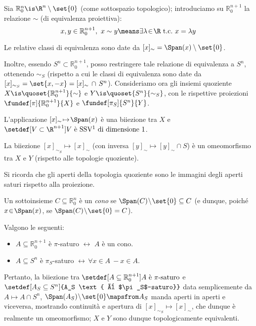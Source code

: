 

\newcommand*\Ps{\mathbb{P}} %
\newcommand*\Ro[1][n]{\mathbb{R}_0^{#1}} %
\newcommand*\tc{\ \text{t.c.} \ } %

Sia $\Ro \is \R^n \setminus \set{0}$ (come sottospazio topologico); introduciamo su $\Ro[n+1]$ la relazione $\sim $ (di equivalenza proiettiva): \[
x, y \in \Ro[n+1], \ x \sim y \means  \exists \lambda \! \in \! \R \tc x = \lambda y \]

Le relative classi di equivalenza sono date da $[x]_\sim = \Span(x) \setminus \set{0}$.

Inoltre, essendo $S^n \subset \Ro[n+1]$, posso restringere tale relazione di equivalenza a $S^n$, ottenendo $\sim_S$ (rispetto a cui le classi di equivalenza sono date da $[x]_{\sim_S} = \set{x, -x} = [x]_\sim \, \cap \, S^n$).
Consideriamo ora gli insiemi quoziente $X \is \quoset{\Ro[n+1]}{\sim}$ e $Y \is \quoset{S^n}{\sim_S}$, con le rispettive proiezioni $\fundef[\pi]{\Ro[n+1]}{X}$ e $\fundef[\pi_S]{S^n}{Y}$.

\begin{oss}
	L'applicazione $[x]_\sim \! \mapsto \! \Span(x)$ è una biiezione tra $X$ e \break
	$\setdef[V \subset \R^{n+1}]{V \text{ è SSV\footnotemark{} di dimensione 1}}$.
\end{oss}

\begin{prop}
	La biiezione $[x]_{\sim_S} \! \mapsto \! [x]_\sim$ (con inversa $[y]_\sim \! \mapsto \! [y]_\sim \cap S$) è un omeomorfismo tra $X$ e $Y$ (rispetto alle topologie quoziente).
\end{prop}

Si ricorda che gli aperti della topologia quoziente sono le immagini degli aperti saturi rispetto alla proiezione.

\begin{defn}[Cono]
	Un sottoinsieme $C\subseteq\Ro$ è un \emph{cono} se $\Span(C)\!\setminus\!\set{0}\subseteq C$ (e dunque, poiché $x\!\in\!\Span(x)$, se $\Span(C)\!\setminus\!\set{0}=C$).
\end{defn}
\begin{lemma}
	 Valgono le seguenti:
	\begin{itemize}
		\item $A \subseteq \Ro[n+1]$ è $\pi$-saturo $\leftrightarrow$ $A$ è un cono.
		\item $A \subseteq S^n$ è $\pi_S$-saturo $\leftrightarrow \, \forall x \!\in\! A \ -\!x \!\in\! A$.
	\end{itemize}
\end{lemma}

Pertanto, la biiezione tra $\setdef[A \subseteq {\Ro[n+1]} ]{A \text{ è $\pi$-saturo}}$ e $\setdef[A_S\subseteq S^n]{A_S \text{ è $\pi_S$-saturo}}$ data semplicemente da $A\mapsto A\cap S^n$, $\Span(A_S)\!\setminus\! \set{0} \mapsfrom A_S$ manda aperti in aperti e viceversa, mostrando continuità e apertura di $[x]_{\sim_S} \! \mapsto \! [x]_\sim$, che dunque è realmente un omeomorfismo; $X$ e $Y$ sono dunque topologicamente equivalenti.

